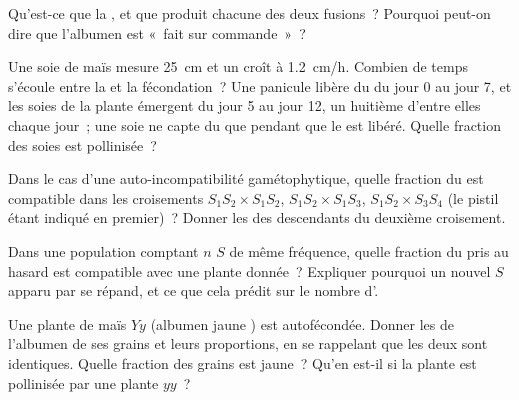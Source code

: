 \begin{exercise}[$\star$]\label{exo:b2:angiosperm-reproduction:4}
Qu'est-ce que la , et que produit chacune des deux
fusions~? Pourquoi peut-on dire que l'albumen est «~fait sur
commande~»~?
\end{exercise}

\begin{exercise}[$\star\star$]\label{exo:b2:angiosperm-reproduction:5}
Une soie de maïs mesure \qty{25}{cm} et un  croît à
\qty{1.2}{cm/h}. Combien de temps s'écoule entre la  et la
fécondation~? Une panicule libère du  du jour 0 au jour 7, et les
soies de la plante émergent du jour 5 au jour 12, un huitième d'entre
elles chaque jour~; une soie ne capte du  que pendant que le
 est libéré. Quelle fraction des soies est pollinisée~?
\end{exercise}

\begin{exercise}[$\star\star$]\label{exo:b2:angiosperm-reproduction:6}
Dans le cas d'une auto-incompatibilité gamétophytique, quelle fraction
du  est compatible dans les croisements $S_1S_2\times S_1S_2$,
$S_1S_2\times
S_1S_3$, $S_1S_2\times S_3S_4$ (le pistil étant indiqué en premier)~?
Donner les  des descendants du deuxième croisement.
\end{exercise}

\begin{exercise}[$\star\star$]\label{exo:b2:angiosperm-reproduction:7}
Dans une population comptant $n$  $S$ de même fréquence, quelle
fraction du  pris au hasard est compatible avec une plante
donnée~? Expliquer pourquoi un nouvel  $S$ apparu par  se
répand, et ce que cela prédit sur le nombre d'.
\end{exercise}

\begin{exercise}[$\star\star$]\label{exo:b2:angiosperm-reproduction:8}
Une plante de maïs  $Yy$ (albumen jaune ) est
autofécondée. Donner les  de l'albumen de ses grains et leurs
proportions, en se rappelant que les deux  sont
identiques. Quelle fraction des grains est jaune~? Qu'en est-il si la
plante est pollinisée par une plante $yy$~?
\end{exercise}

